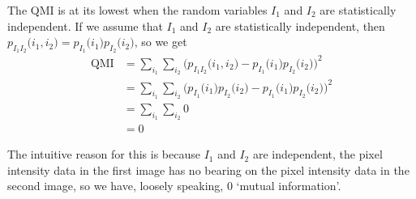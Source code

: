 \documentclass[a4paper]{article}
\begin{document}
\begin{enumerate}[label=(\alph*)]
The QMI is at its lowest when the random variables $I_1$ and $I_2$ are statistically independent. If we assume that $I_1$ and $I_2$ are statistically independent, then $p_{I_1 I_2}\big( i_1, i_2\big) = p_{I_1}\big( i_1\big)p_{I_2}\big( i_2\big)$, so we get
\begin{align*}
\text{QMI} &= \sum\limits_{i_1} \sum\limits_{i_2} \Big( p_{I_1 I_2}\big( i_1, i_2\big) - p_{I_1}\big( i_1\big)p_{I_2}\big( i_2\big) \Big)^2 \nonumber \\
&= \sum\limits_{i_1} \sum\limits_{i_2} \Big( p_{I_1}\big( i_1\big)p_{I_2}\big( i_2\big) - p_{I_1}\big( i_1\big)p_{I_2}\big( i_2\big) \Big)^2 \\
&= \sum\limits_{i_1} \sum\limits_{i_2} 0 \\
&= 0
\end{align*}

The intuitive reason for this is because $I_1$ and $I_2$ are independent, the pixel intensity data in the first image has no bearing on the pixel intensity data in the second image, so we have, loosely speaking, 0 `mutual information'.
\end{enumerate}
\end{document}
